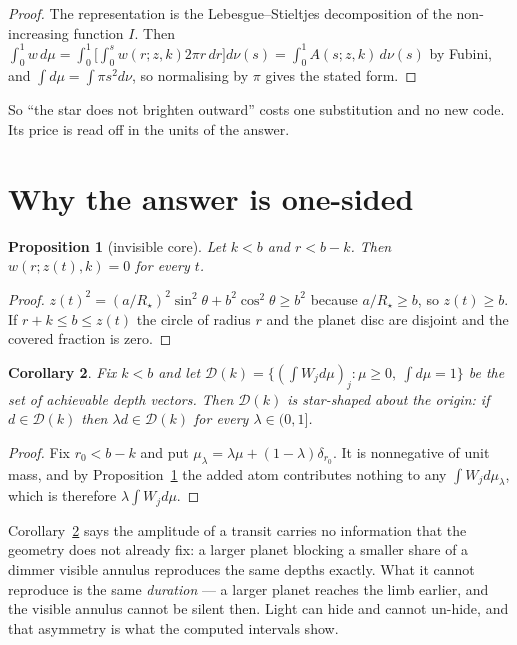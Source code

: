 \documentclass[11pt]{article}
\newtheorem{proposition}{Proposition}
\newtheorem{corollary}[proposition]{Corollary}
\begin{document}
\begin{proof}
The representation is the Lebesgue--Stieltjes decomposition of the non-increasing
function $I$. Then
$\int_0^1 w\,d\mu=\int_0^1\!\big[\int_0^s w(r;z,k)2\pi r\,dr\big]d\nu(s)
=\int_0^1 A(s;z,k)\,d\nu(s)$ by Fubini, and $\int d\mu=\int \pi s^2 d\nu$, so
normalising by $\pi$ gives the stated form.
\end{proof}

So ``the star does not brighten outward'' costs one substitution and no new code.
Its price is read off in the units of the answer.

\section{Why the answer is one-sided}

\begin{proposition}[invisible core]\label{prop:core}
Let $k<b$ and $r<b-k$. Then $w(r;z(t),k)=0$ for every $t$.
\end{proposition}

\begin{proof}
$z(t)^2=(a/R_\star)^2\sin^2\theta+b^2\cos^2\theta\ge b^2$ because
$a/R_\star\ge b$, so $z(t)\ge b$. If $r+k\le b\le z(t)$ the circle of radius $r$
and the planet disc are disjoint and the covered fraction is zero.
\end{proof}

\begin{corollary}\label{cor:star}
Fix $k<b$ and let $\mathcal D(k)=\{(\int W_j d\mu)_j : \mu\ge0,\ \int d\mu=1\}$
be the set of achievable depth vectors. Then $\mathcal D(k)$ is star-shaped about
the origin: if $d\in\mathcal D(k)$ then $\lambda d\in\mathcal D(k)$ for every
$\lambda\in(0,1]$.
\end{corollary}

\begin{proof}
Fix $r_0<b-k$ and put $\mu_\lambda=\lambda\mu+(1-\lambda)\delta_{r_0}$. It is
nonnegative of unit mass, and by Proposition~\ref{prop:core} the added atom
contributes nothing to any $\int W_j d\mu_\lambda$, which is therefore
$\lambda\int W_j d\mu$.
\end{proof}

Corollary~\ref{cor:star} says the amplitude of a transit carries no information
that the geometry does not already fix: a larger planet blocking a smaller share
of a dimmer visible annulus reproduces the same depths exactly. What it cannot
reproduce is the same \emph{duration} --- a larger planet reaches the limb
earlier, and the visible annulus cannot be silent then. Light can hide and cannot
un-hide, and that asymmetry is what the computed intervals show.
\end{document}
